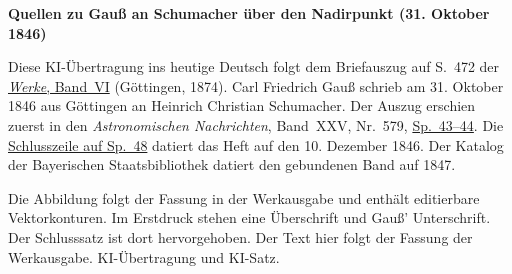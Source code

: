 \clearpage\thispagestyle{empty}
\begin{center}\textbf{Quellen zu Gauß an Schumacher über den Nadirpunkt (31. Oktober 1846)}\end{center}
\noindent Diese KI-Übertragung ins heutige Deutsch folgt dem Briefauszug auf S.~472 der \href{https://gdz.sub.uni-goettingen.de/id/PPN236007467}{\textit{Werke}, Band~VI} (Göttingen, 1874). Carl Friedrich Gauß schrieb am 31. Oktober 1846 aus Göttingen an Heinrich Christian Schumacher. Der Auszug erschien zuerst in den \textit{Astronomischen Nachrichten}, Band~XXV, Nr.~579, \href{https://api.digitale-sammlungen.de/iiif/image/v2/bsb10049450_00030/full/1800,/0/default.jpg}{Sp.~43--44}. Die \href{https://api.digitale-sammlungen.de/iiif/image/v2/bsb10049450_00032/full/1800,/0/default.jpg}{Schlusszeile auf Sp.~48} datiert das Heft auf den 10. Dezember 1846. Der Katalog der Bayerischen Staatsbibliothek datiert den gebundenen Band auf 1847.
\par\smallskip\noindent Die Abbildung folgt der Fassung in der Werkausgabe und enthält editierbare Vektorkonturen. Im Erstdruck stehen eine Überschrift und Gauß’ Unterschrift. Der Schlusssatz ist dort hervorgehoben. Der Text hier folgt der Fassung der Werkausgabe. KI-Übertragung und KI-Satz.
\clearpage
